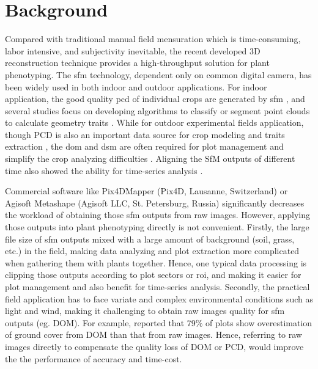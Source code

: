 \documentclass[doublespacing]{configs/bmcart}
\begin{document}
\section*{Background}
Compared with traditional manual field mensuration which is time-consuming, labor intensive, and subjectivity inevitable, the recent developed 3D reconstruction technique provides a high-throughput solution for plant phenotyping. The \acrfull*{sfm} technology, dependent only on common digital camera, has been widely used in both indoor and outdoor applications. For indoor application, the good quality \acrfull*{pcd} of individual crops are generated by \acrshort*{sfm} \cite{wang_maize_2019, rossi_performances_2020}, and several studies focus on developing algorithms to classify or segment point clouds to calculate geometry traits \cite{ziamtsov_machine_2019, artzet_phenomenal_2019}. While for outdoor experimental fields application, though PCD is also an important data source for crop modeling and traits extraction \cite{jay_field_2015, sun_three-dimensional_2020, zhu_quantification_2020}, the \acrfull*{dom} and \acrfull*{dsm} are often required for plot management and simplify the crop analyzing difficulties \cite{sun_field_2018, tresch_easympe_2019, chen_grid_2020}. Aligning the SfM outputs of different time also showed the ability for time-series analysis \cite{dong_4d_2017, han_clustering_2018}.

Commercial software like Pix4DMapper (Pix4D, Lausanne, Switzerland) or Agisoft Metashape (Agisoft LLC, St. Petersburg, Russia) significantly decreases the workload of obtaining those \acrshort*{sfm} outputs from raw images. However, applying those outputs into plant phenotyping directly is not convenient. Firstly, the large file size of \acrshort*{sfm} outputs mixed with a large amount of background (soil, grass, etc.) in the field, making data analyzing and plot extraction more complicated when gathering them with plants together. Hence, one typical data processing is clipping those outputs according to plot sectors or \acrfull*{roi}, and making it easier for plot management and also benefit for time-series analysis. Secondly, the practical field application has to face variate and complex environmental conditions such as light and wind,  making it challenging to obtain raw images quality for \acrshort*{sfm} outputs (eg. DOM). For example, \cite{duan_comparison_2017} reported that 79\% of plots show overestimation of ground cover from DOM than that from raw images. Hence, referring to raw images directly to compensate the quality loss of DOM or PCD, would improve the the performance of accuracy and time-cost.
\end{document}
